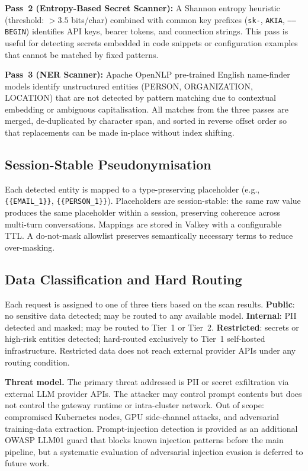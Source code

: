 \documentclass[conference]{IEEEtran}
\begin{document}
\textbf{Pass~2 (Entropy-Based Secret Scanner):} A Shannon entropy heuristic (threshold: $>3.5$ bits/char) combined with common key prefixes (\texttt{sk-}, \texttt{AKIA}, \texttt{-----BEGIN}) identifies API keys, bearer tokens, and connection strings. This pass is useful for detecting secrets embedded in code snippets or configuration examples that cannot be matched by fixed patterns.

\textbf{Pass~3 (NER Scanner):} Apache OpenNLP pre-trained English name-finder models identify unstructured entities (PERSON, ORGANIZATION, LOCATION) that are not detected by pattern matching due to contextual embedding or ambiguous capitalisation. All matches from the three passes are merged, de-duplicated by character span, and sorted in reverse offset order so that replacements can be made in-place without index shifting.

\subsection{Session-Stable Pseudonymisation}
Each detected entity is mapped to a type-preserving placeholder (e.g., \texttt{\{\{EMAIL\_1\}\}}, \texttt{\{\{PERSON\_1\}\}}). Placeholders are session-stable: the same raw value produces the same placeholder within a session, preserving coherence across multi-turn conversations. Mappings are stored in Valkey with a configurable TTL. A do-not-mask allowlist preserves semantically necessary terms to reduce over-masking.

\subsection{Data Classification and Hard Routing}
Each request is assigned to one of three tiers based on the scan results. \textbf{Public}: no sensitive data detected; may be routed to any available model. \textbf{Internal}: PII detected and masked; may be routed to Tier~1 or Tier~2. \textbf{Restricted}: secrets or high-risk entities detected; hard-routed exclusively to Tier~1 self-hosted infrastructure. Restricted data does not reach external provider APIs under any routing condition.

\textbf{Threat model.} The primary threat addressed is PII or secret exfiltration via external LLM provider APIs. The attacker may control prompt contents but does not control the gateway runtime or intra-cluster network. Out of scope: compromised Kubernetes nodes, GPU side-channel attacks, and adversarial training-data extraction. Prompt-injection detection is provided as an additional OWASP LLM01 guard \cite{b_owasp_llm} that blocks known injection patterns before the main pipeline, but a systematic evaluation of adversarial injection evasion is deferred to future work.
\end{document}

